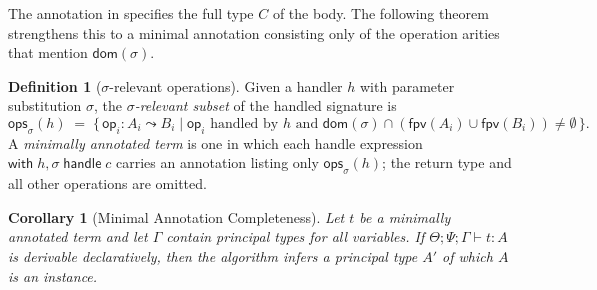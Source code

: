 \documentclass{article}
\newtheorem{corollary}[theorem]{Corollary}
\theoremstyle{definition}
\newtheorem{definition}[theorem]{Definition}
\theoremstyle{remark}
\newcommand{\op}{\mathsf{op}}
\newcommand{\with}{\mathsf{with}\;}
\newcommand{\handle}{\;\mathsf{handle}\;}
\newcommand{\dom}{\mathsf{dom}}
\newcommand{\G}{\Gamma}
\newcommand{\fpv}{\mathsf{fpv}}
\newcommand{\ops}{\mathsf{ops}}
\newcommand{\cjp}[5]{#1; #2; #3 \vdash #4 : #5}                  %
\begin{document}
The annotation in  specifies the full type $C$ of the body.
The following theorem strengthens this to a minimal annotation consisting only of the
operation arities that mention $\dom(\sigma)$.

\begin{definition}[$\sigma$-relevant operations] \label{def:relevant}
  Given a handler $h$ with parameter substitution $\sigma$, the
  \emph{$\sigma$-relevant subset} of the handled signature is
  \[
    \ops_\sigma(h)
    \;=\;
    \bigl\{\,\op_i : A_i \leadsto B_i \mid
      \op_i \text{ handled by } h
      \text{ and }
      \dom(\sigma) \cap (\fpv(A_i) \cup \fpv(B_i)) \neq \emptyset
    \,\bigr\}.
  \]
  A \emph{minimally annotated term} is one in which each handle expression
  $\with h, \sigma \handle c$ carries an annotation listing only $\ops_\sigma(h)$;
  the return type and all other operations are omitted.
\end{definition}

\begin{corollary}[Minimal Annotation Completeness]\label{thm:minimal-complete}
  Let $t$ be a minimally annotated term and let $\G$ contain principal types for all
  variables.
  If $\cjp{\Theta}{\Psi}{\G}{t}{A}$ is derivable declaratively, then the algorithm
  infers a principal type $A'$ of which $A$ is an instance.
\end{corollary}
\end{document}
